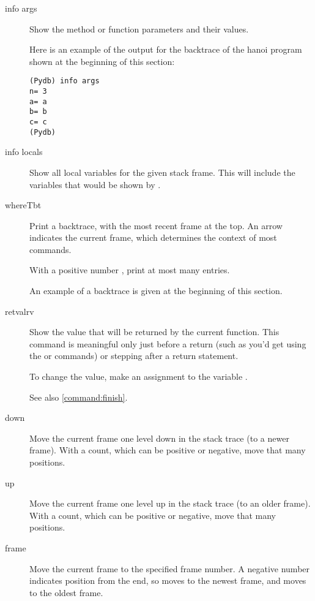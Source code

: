 \begin{description}

\item[info args]\label{command:info-args}

Show the method or function parameters and their values. 

Here is an example of the output for the backtrace of the hanoi
program shown at the beginning of this section:

\begin{verbatim}
(Pydb) info args
n= 3
a= a
b= b
c= c
(Pydb) 
\end{verbatim}

\item[info locals]\label{command:info-locals}

Show all local variables for the given stack frame. This will include
the variables that would be shown by .

\item[where\code{\Large{|}}T\code{\Large{|}}bt ]

Print a backtrace, with the most recent frame at the top.  An
arrow indicates the current frame, which determines the context of
most commands.

With a positive number , print at most many entries.

An example of a backtrace is given at the beginning of this section.

\item[retval\code{\Large{|}}rv]\label{command:retval}

Show the value that will be returned by the current function. This
command is meaningful only just before a return (such as you'd get
using the  or  commands) or stepping after a
return statement.

To change the value, make an assignment to the variable
.

See also \ref{command:finish}.

\item[down ]

Move the current frame one level down in the stack trace
(to a newer frame). With a count, which can be  positive
or  negative, move that many positions.

\item[up ]

Move the current frame one level up in the stack trace (to an older
frame). With a count, which can be positive or negative,
move that many positions.

\item[frame ]
Move the current frame to the specified frame number. A negative
number indicates position from the end, so  moves to 
the newest frame, and  moves to the oldest frame.

\end{description}

